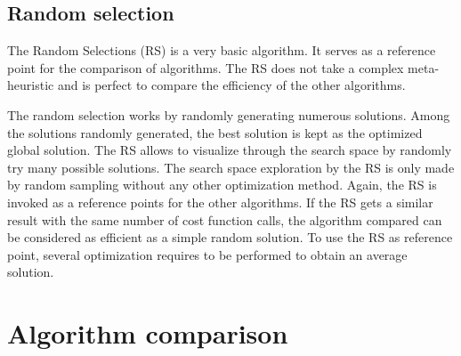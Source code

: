 

\subsection{Random selection }

The Random Selections (RS) is a very basic algorithm. It serves as a reference point for the comparison of  algorithms. The RS does not take a complex meta-heuristic and is perfect to compare the efficiency of the other algorithms.

The random selection works by randomly generating numerous solutions. Among the solutions randomly generated, the best solution is kept as the optimized global solution. The RS allows to visualize through the search space by randomly try many possible solutions. The search space exploration by the RS is only made by random sampling without any other optimization method. 
Again, the RS is invoked as a reference points for the other algorithms. If the RS gets a similar result with the same number of cost function calls, the algorithm compared can be considered as efficient as a simple random solution. 
To use the RS as reference point, several optimization requires to be performed to obtain an average solution.
  
%
%

\section{Algorithm comparison }\label{sec:GAvsPSO} 
%

